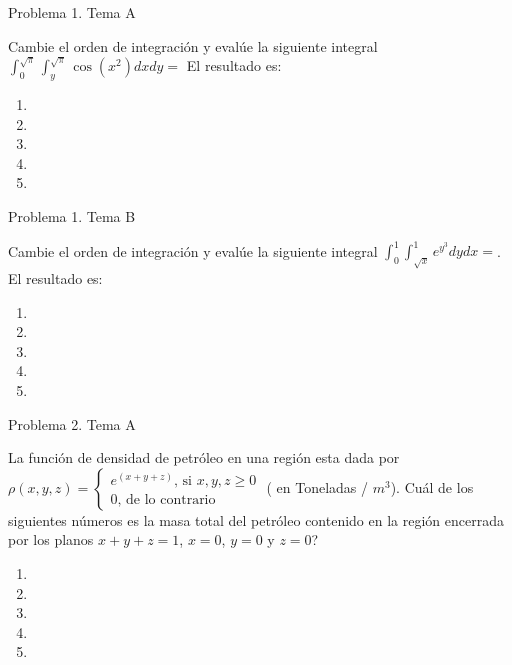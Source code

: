 \documentclass[usepdftitle=false]{beamer}
\begin{document}
\begin{frame}{Problema 1. Tema A}

Cambie el orden de integraci\'on y eval\'ue la siguiente integral 
$\int_0^{\sqrt{\pi}}\int_y^{\sqrt{\pi}}\cos(x^2)dxdy=$ El resultado es:

\begin{enumerate}
\item
\item
\item
\item
\item

\end{enumerate}


\end{frame}

\begin{frame}{Problema 1. Tema B}

Cambie el orden de integraci\'on y eval\'ue la siguiente integral 
$\int_0^{1}\int_{\sqrt{x}}^{1}e^{y^3}dydx=$. El resultado es:


\begin{enumerate}
\item
\item
\item
\item
\item
\end{enumerate}

\end{frame}

\begin{frame}{Problema 2. Tema A}

La funci\'on de densidad de petr\'oleo en una regi\'on esta dada por $\rho(x,y,z)=\begin{cases}
e^{(x+y+z)}\text{, si $x,y,z\geq 0$}\\
0\text{, de lo contrario}
\end{cases}$
( en Toneladas / $m^3$). Cu\'al de los siguientes n\'umeros es la masa total del petr\'oleo contenido en la regi\'on encerrada por los planos $x+y+z=1$, $x=0$, $y=0$ y $z=0$?
\begin{enumerate}
\item
\item
\item
\item
\item
\end{enumerate}
\end{frame}
\end{document}
